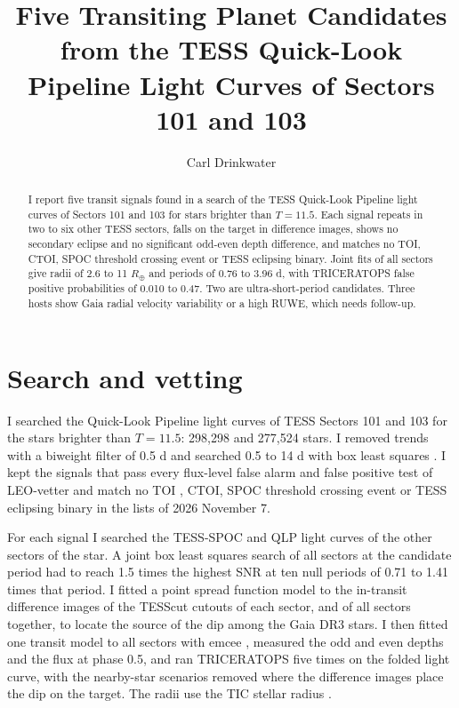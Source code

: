 \documentclass{aastex701}
\begin{document}
\title{Five Transiting Planet Candidates from the TESS Quick-Look Pipeline Light Curves of Sectors 101 and 103}

\author[0000-0000-0000-0000]{Carl Drinkwater}

\begin{abstract}
I report five transit signals found in a search of the TESS Quick-Look Pipeline light curves of Sectors 101 and
103 for stars brighter than $T=11.5$. Each signal repeats in two to six other TESS sectors, falls on the target in
difference images, shows no secondary eclipse and no significant odd-even depth difference, and matches no TOI,
CTOI, SPOC threshold crossing event or TESS eclipsing binary. Joint fits of all sectors give radii of 2.6 to
11 $R_\oplus$ and periods of 0.76 to 3.96 d, with TRICERATOPS false positive probabilities of 0.010 to 0.47. Two are
ultra-short-period candidates. Three hosts show Gaia radial velocity variability or a high RUWE, which needs
follow-up.
\end{abstract}

\section{Search and vetting}

I searched the Quick-Look Pipeline \citep[QLP;][]{huang2020a,huang2020b,kunimoto2021} light curves of TESS
\citep{ricker2015} Sectors 101 and 103 for the stars brighter than $T=11.5$: 298,298 and 277,524 stars. I removed
trends with a biweight filter of 0.5 d \citep{hippke2019} and searched 0.5 to 14 d with box least squares
\citep{kovacs2002}. I kept the signals that pass every flux-level false alarm and false positive test of LEO-vetter
\citep{kunimoto2025} and match no TOI \citep{guerrero2021}, CTOI, SPOC threshold crossing event or TESS eclipsing
binary \citep{prsa2022} in the lists of 2026 November 7.

For each signal I searched the TESS-SPOC \citep{caldwell2020} and QLP light curves of the other sectors of the
star. A joint box least squares search of all sectors at the candidate period had to reach 1.5 times the highest
SNR at ten null periods of 0.71 to 1.41 times that period. I fitted a point spread function model to the in-transit difference images \citep{bryson2013} of the TESScut
cutouts \citep{brasseur2019} of each sector, and of all sectors together, to locate the source of the dip among the
Gaia DR3 \citep{gaia2023} stars. I then fitted one transit model \citep{kreidberg2015} to all sectors with emcee
\citep{foremanmackey2013}, measured the odd and even depths and the flux at phase 0.5, and ran TRICERATOPS
\citep{giacalone2021} five times on the folded light curve, with the nearby-star scenarios removed where the
difference images place the dip on the target. The radii use the TIC stellar radius \citep{stassun2019}.
\end{document}
